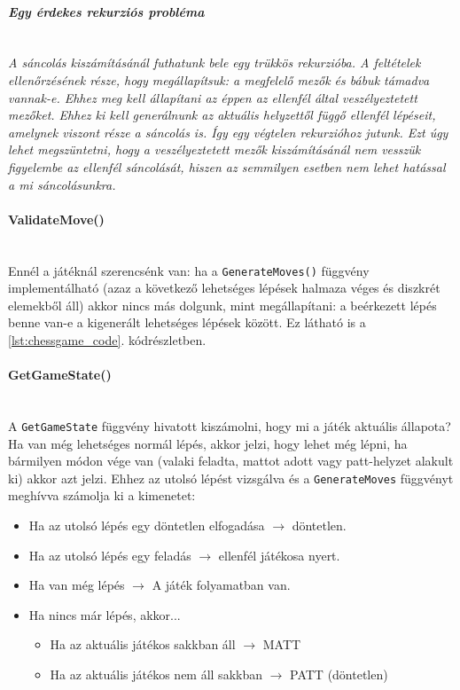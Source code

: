 \documentclass[twoside, a4paper, 12pt]{article}
\begin{document}
\paragraph{\textit{Egy érdekes rekurziós probléma}} \mbox{} \\
\textit{A sáncolás kiszámításánál futhatunk bele egy trükkös rekurzióba. A feltételek ellenőrzésének része, hogy megállapítsuk: a megfelelő mezők és bábuk támadva vannak-e. Ehhez meg kell állapítani az éppen az ellenfél által veszélyeztetett mezőket. Ehhez ki kell generálnunk az aktuális helyzettől függő ellenfél lépéseit, amelynek viszont része a sáncolás is. Így egy végtelen rekurzióhoz jutunk. Ezt úgy lehet megszüntetni, hogy a veszélyeztetett mezők kiszámításánál nem vesszük figyelembe az ellenfél sáncolását, hiszen az semmilyen esetben nem lehet hatással a mi sáncolásunkra.}

\paragraph{ValidateMove()} \mbox{} \\
Ennél a játéknál szerencsénk van: ha a \texttt{GenerateMoves()} függvény implementálható (azaz a következő lehetséges lépések halmaza véges és diszkrét elemekből áll) akkor nincs más dolgunk, mint megállapítani: a beérkezett lépés benne van-e a kigenerált lehetséges lépések között. Ez látható is a \ref{lst:chessgame_code}. kódrészletben.

\paragraph{GetGameState()} \mbox{} \\
A \texttt{GetGameState} függvény hivatott kiszámolni, hogy mi a játék aktuális állapota? Ha van még lehetséges normál lépés, akkor jelzi, hogy lehet még lépni, ha bármilyen módon vége van (valaki feladta, mattot adott vagy patt-helyzet alakult ki) akkor azt jelzi. Ehhez az utolsó lépést vizsgálva és a \texttt{GenerateMoves} függvényt meghívva számolja ki a kimenetet:

\begin{itemize}
	\item Ha az utolsó lépés egy döntetlen elfogadása $\to$ döntetlen.
	\item Ha az utolsó lépés egy feladás $\to$ ellenfél játékosa nyert.
	\item Ha van még lépés $\to$ A játék folyamatban van.
	\item Ha nincs már lépés, akkor...
	\begin{itemize}
		\item Ha az aktuális játékos sakkban áll $\to$ MATT
		\item Ha az aktuális játékos nem áll sakkban $\to$ PATT (döntetlen)
	\end{itemize}
\end{itemize}
\end{document}

